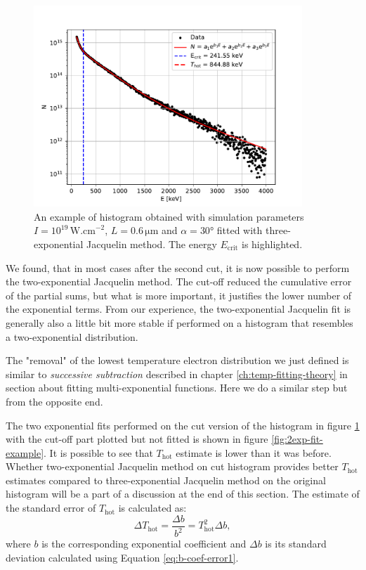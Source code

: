 \begin{figure}[t]
	\centering
	\includegraphics[width=0.9\textwidth]{figures/hist_1e19_060_30_3exp}
	\caption{An example of histogram obtained with simulation parameters $I=10^{19}\,\mathrm{W.cm}^{-2}$, $L=0.6\,\mathrm{\mu m}$ and $\alpha = 30$° fitted with three-exponential Jacquelin method. The energy $E_{\mathrm{crit}}$ is highlighted.}
	\label{fig:3exp-fit-cut-example}
\end{figure}

We found, that in most cases after the second cut, it is now possible to perform the two-exponential Jacquelin method. The cut-off reduced the cumulative error of the partial sums, but what is more important, it justifies the lower number of the exponential terms. From our experience, the two-exponential Jacquelin fit is generally also a little bit more stable if performed on a histogram that resembles a two-exponential distribution. 

The "removal" of the lowest temperature electron distribution we just defined is similar to \textit{successive subtraction} described in chapter \ref{ch:temp-fitting-theory} in section about fitting multi-exponential functions. Here we do a similar step but from the opposite end.

The two exponential fits performed on the cut version of the histogram in figure \ref{fig:3exp-fit-cut-example} with the cut-off part plotted but not fitted is shown in figure \ref{fig:2exp-fit-example}. It is possible to see that $T_{\mathrm{hot}}$ estimate is lower than it was before. Whether two-exponential Jacquelin method on cut histogram provides better $T_{\mathrm{hot}}$ estimates compared to three-exponential Jacquelin method on the original histogram will be a part of a discussion at the end of this section. The estimate of the standard error of $T_{\mathrm{hot}}$ is calculated as:
\begin{equation}
	\label{eq:t-hot-error}
	\Delta T_\mathrm{hot} = \frac{\Delta b}{b^2} = T_\mathrm{hot}^2\Delta b,
\end{equation}
where $b$ is the corresponding exponential coefficient and $\Delta b$ is its standard deviation calculated using Equation \ref{eq:b-coef-error1}.

